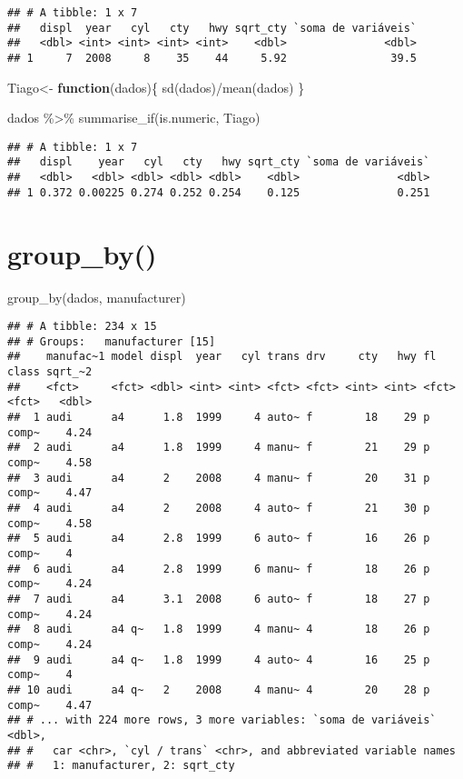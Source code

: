 \documentclass[
]{book}
\newenvironment{Shaded}{\begin{snugshade}}{\end{snugshade}}
\newcommand{\ControlFlowTok}[1]{\textcolor[rgb]{0.13,0.29,0.53}{\textbf{#1}}}
\newcommand{\FunctionTok}[1]{\textcolor[rgb]{0.00,0.00,0.00}{#1}}
\newcommand{\NormalTok}[1]{#1}
\newcommand{\OtherTok}[1]{\textcolor[rgb]{0.56,0.35,0.01}{#1}}
\newcommand{\SpecialCharTok}[1]{\textcolor[rgb]{0.00,0.00,0.00}{#1}}
\begin{document}
\begin{verbatim}
## # A tibble: 1 x 7
##   displ  year   cyl   cty   hwy sqrt_cty `soma de variáveis`
##   <dbl> <int> <int> <int> <int>    <dbl>               <dbl>
## 1     7  2008     8    35    44     5.92                39.5
\end{verbatim}

\begin{Shaded}
\begin{Highlighting}[]
\NormalTok{Tiago}\OtherTok{\textless{}{-}} \ControlFlowTok{function}\NormalTok{(dados)\{}
  \FunctionTok{sd}\NormalTok{(dados)}\SpecialCharTok{/}\FunctionTok{mean}\NormalTok{(dados)}
\NormalTok{\}}

\NormalTok{dados }\SpecialCharTok{\%\textgreater{}\%}
  \FunctionTok{summarise\_if}\NormalTok{(is.numeric, Tiago) }
\end{Highlighting}
\end{Shaded}

\begin{verbatim}
## # A tibble: 1 x 7
##   displ    year   cyl   cty   hwy sqrt_cty `soma de variáveis`
##   <dbl>   <dbl> <dbl> <dbl> <dbl>    <dbl>               <dbl>
## 1 0.372 0.00225 0.274 0.252 0.254    0.125               0.251
\end{verbatim}

\hypertarget{group_by}{%
\section{group\_by()}\label{group_by}}

\begin{Shaded}
\begin{Highlighting}[]
\FunctionTok{group\_by}\NormalTok{(dados, manufacturer)}
\end{Highlighting}
\end{Shaded}

\begin{verbatim}
## # A tibble: 234 x 15
## # Groups:   manufacturer [15]
##    manufac~1 model displ  year   cyl trans drv     cty   hwy fl    class sqrt_~2
##    <fct>     <fct> <dbl> <int> <int> <fct> <fct> <int> <int> <fct> <fct>   <dbl>
##  1 audi      a4      1.8  1999     4 auto~ f        18    29 p     comp~    4.24
##  2 audi      a4      1.8  1999     4 manu~ f        21    29 p     comp~    4.58
##  3 audi      a4      2    2008     4 manu~ f        20    31 p     comp~    4.47
##  4 audi      a4      2    2008     4 auto~ f        21    30 p     comp~    4.58
##  5 audi      a4      2.8  1999     6 auto~ f        16    26 p     comp~    4   
##  6 audi      a4      2.8  1999     6 manu~ f        18    26 p     comp~    4.24
##  7 audi      a4      3.1  2008     6 auto~ f        18    27 p     comp~    4.24
##  8 audi      a4 q~   1.8  1999     4 manu~ 4        18    26 p     comp~    4.24
##  9 audi      a4 q~   1.8  1999     4 auto~ 4        16    25 p     comp~    4   
## 10 audi      a4 q~   2    2008     4 manu~ 4        20    28 p     comp~    4.47
## # ... with 224 more rows, 3 more variables: `soma de variáveis` <dbl>,
## #   car <chr>, `cyl / trans` <chr>, and abbreviated variable names
## #   1: manufacturer, 2: sqrt_cty
\end{verbatim}
\end{document}
